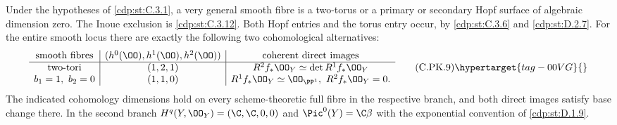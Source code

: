 \begin{proposition}\hypertarget{tag-01F6}{}\label{cdp:st:C.3.11}



Under the hypotheses of \ref{cdp:st:C.3.1}, a very general smooth fibre
is a two-torus or a primary or secondary Hopf surface of
algebraic dimension zero. The Inoue exclusion is \ref{cdp:st:C.3.12}.
Both Hopf
entries and the torus entry occur, by \ref{cdp:st:C.3.6} and \ref{cdp:st:D.2.7}.
For the entire smooth locus there are exactly the following
two cohomological alternatives:
\[
\begin{array}{c|c|c}
\text{smooth fibres}&
 (h^0(\OO),h^1(\OO),h^2(\OO))&
 \text{coherent direct images}\\ \hline
\text{two-tori}&(1,2,1)&
 R^2f_*\OO_Y\simeq\det R^1f_*\OO_Y\\
b_1=1,\ b_2=0&(1,1,0)&
 R^1f_*\OO_Y\simeq\OO_{\PP^1},\
 R^2f_*\OO_Y=0 .
\end{array}
\tag{C.PK.9}\hypertarget{tag-00VG}{}\label{cdp:eq:C.PK.9}
\]
The indicated cohomology dimensions hold on every
scheme-theoretic full fibre in the respective branch,
and both direct images satisfy base change there.
In the second branch
$H^q(Y,\OO_Y)=(\C,\C,0,0)$ and
$\Pic^0(Y)=\C\beta$ with the exponential convention
of \ref{cdp:st:D.1.9}.
\end{proposition}

